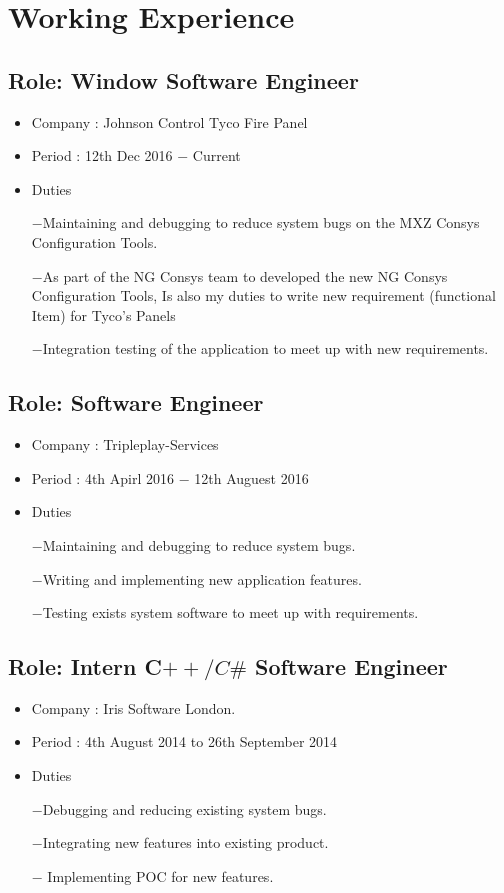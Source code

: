 \documentclass[11px]{article}
\begin{document}
 \section*{Working Experience}
  \subsection*{Role: Window Software Engineer}
  \begin{itemize}
  	\item  Company : Johnson Control Tyco Fire Panel
  	\item Period   : 12th Dec 2016 $-$ Current
  	\item Duties
  	
  	$-$Maintaining and debugging to reduce system bugs on the MXZ Consys Configuration Tools. 
  	
  	$-$As part of the NG Consys team to developed the new NG Consys Configuration Tools, Is also my duties to write new requirement (functional Item) for Tyco's Panels
  	
  	$-$Integration testing of the application to meet up with new requirements.
  \end{itemize}
  
  \subsection*{Role: Software Engineer}
  \begin{itemize}
  	\item  Company : Tripleplay-Services
  	\item Period   : 4th Apirl 2016 $-$  12th Auguest 2016
  	\item Duties
  	
  	   $-$Maintaining and debugging to reduce system bugs. 
  	   
  	   $-$Writing and implementing new application features.
  	   
  	   $-$Testing exists system software to meet up with requirements.
  \end{itemize}


  \subsection*{Role: Intern C$++/C\#$ Software Engineer}
  \begin{itemize}
  	\item  Company :  Iris Software London.
  	\item Period   : 4th August 2014 to 26th September 2014
  	\item Duties
  	
       $-$Debugging and reducing  existing system bugs.
       
       $-$Integrating new features into existing product.
       
       $-$ Implementing POC for new features.
  \end{itemize}
  
\end{document}
